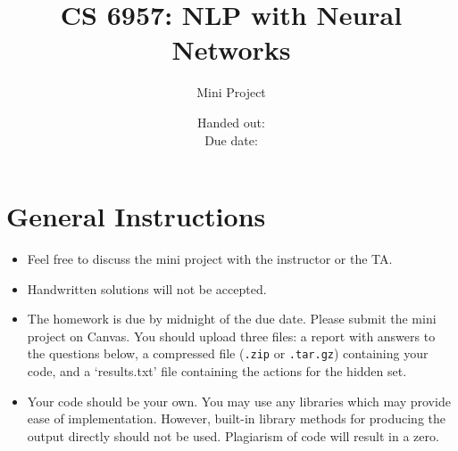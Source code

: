 \documentclass[12pt, fullpage,letterpaper]{article}
\title{CS 6957: NLP with Neural Networks \semester}
\author{Mini Project \assignmentId}
\date{Handed out: \releaseDate\\
  Due date: \dueDate}
\begin{document}
\maketitle

\section*{General Instructions}

{\footnotesize
  \begin{itemize}

  \item Feel free to discuss the mini project with the instructor or the TA.

  \item Handwritten solutions will not be accepted.

  \item  The homework is due by midnight of the due date. Please submit
    the mini project on Canvas. You should upload three files: a report with answers to the questions below, a compressed file (\texttt{.zip} or \texttt{.tar.gz}) containing your code, and a `results.txt' file containing the actions for the hidden set.

  \item Your code should be your own. You may use any libraries which may provide ease of implementation. However, built-in library methods for producing the output directly should not be used. Plagiarism of code will result in a zero.

  \end{itemize}


}






\end{document}
